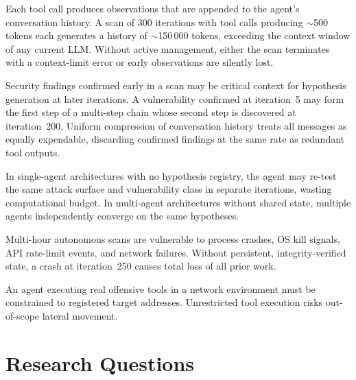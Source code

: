 \documentclass[12pt, a4paper, oneside, openany]{book}
\begin{document}
\begin{description}[leftmargin=1.5em, font=\bfseries]
  \item[P1 --- Context accumulation:]
    Each tool call produces observations that are appended to the
    agent's conversation history.  A scan of 300 iterations with
    tool calls producing $\sim$500 tokens each generates a history
    of $\sim$150\,000 tokens, exceeding the context window of
    any current LLM.  Without active management, either the scan
    terminates with a context-limit error or early observations
    are silently lost.

  \item[P2 --- Finding preservation:]
    Security findings confirmed early in a scan may be critical
    context for hypothesis generation at later iterations.
    A vulnerability confirmed at iteration~5 may form the first
    step of a multi-step chain whose second step is discovered at
    iteration~200.  Uniform compression of conversation history
    treats all messages as equally expendable, discarding confirmed
    findings at the same rate as redundant tool outputs.

  \item[P3 --- Redundant hypothesis exploration:]
    In single-agent architectures with no hypothesis registry,
    the agent may re-test the same attack surface and vulnerability
    class in separate iterations, wasting computational budget.
    In multi-agent architectures without shared state, multiple
    agents independently converge on the same hypotheses.

  \item[P4 --- Crash resilience:]
    Multi-hour autonomous scans are vulnerable to process crashes,
    OS kill signals, API rate-limit events, and network failures.
    Without persistent, integrity-verified state, a crash at
    iteration~250 causes total loss of all prior work.

  \item[P5 --- Scope enforcement:]
    An agent executing real offensive tools in a network environment
    must be constrained to registered target addresses.  Unrestricted
    tool execution risks out-of-scope lateral movement.
\end{description}

\section{Research Questions}
\label{sec:rq}
\end{document}
